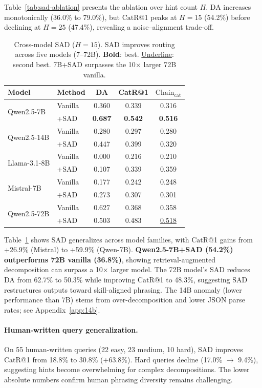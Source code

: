 \documentclass[11pt]{article}
\newcommand{\catrecall}{\text{CatR}}
\newcommand{\chaincat}{\text{Chain}_\text{cat}}
\begin{document}
Table~\ref{tab:sad-ablation} presents the ablation over hint count $H$.
DA increases monotonically (36.0\% to 79.0\%), but $\catrecall$@1 peaks at $H{=}15$ (54.2\%) before declining at $H{=}25$ (47.4\%), revealing a noise--alignment trade-off.

\begin{table}[t]
\centering
\small
\begin{tabular}{llccc}
\toprule
\textbf{Model} & \textbf{Method} & \textbf{DA} & \textbf{CatR@1} & $\chaincat$ \\
\midrule
\multirow{2}{*}{Qwen2.5-7B} & Vanilla & 0.360 & 0.339 & 0.316 \\
 & +SAD & \textbf{0.687} & \textbf{0.542} & \textbf{0.516} \\
\midrule
\multirow{2}{*}{Qwen2.5-14B} & Vanilla & 0.280 & 0.297 & 0.280 \\
 & +SAD & 0.447 & 0.399 & 0.320 \\
\midrule
\multirow{2}{*}{Llama-3.1-8B} & Vanilla & 0.000 & 0.216 & 0.210 \\
 & +SAD & 0.107 & 0.339 & 0.359 \\
\midrule
\multirow{2}{*}{Mistral-7B} & Vanilla & 0.177 & 0.242 & 0.248 \\
 & +SAD & 0.273 & 0.307 & 0.301 \\
\midrule
\multirow{2}{*}{Qwen2.5-72B} & Vanilla & 0.627 & 0.368 & 0.358 \\
 & +SAD & 0.503 & 0.483 & \underline{0.518} \\
\bottomrule
\end{tabular}
\caption{Cross-model SAD ($H{=}15$). SAD improves routing across five models (7--72B). \textbf{Bold}: best. \underline{Underline}: second best. 7B+SAD surpasses the 10$\times$ larger 72B vanilla.}
\label{tab:sad-crossmodel}
\end{table}

Table~\ref{tab:sad-crossmodel} shows SAD generalizes across model families, with $\catrecall$@1 gains from +26.9\% (Mistral) to +59.9\% (Qwen-7B).
\textbf{Qwen2.5-7B+SAD (54.2\%) outperforms 72B vanilla (36.8\%)}, showing retrieval-augmented decomposition can surpass a 10$\times$ larger model.
The 72B model's SAD reduces DA from 62.7\% to 50.3\% while improving $\catrecall$@1 to 48.3\%, suggesting SAD restructures outputs toward skill-aligned phrasing.
The 14B anomaly (lower performance than 7B) stems from over-decomposition and lower JSON parse rates; see Appendix~\ref{app:14b}.

\paragraph{Human-written query generalization.}
On 55 human-written queries (22 easy, 23 medium, 10 hard), SAD improves $\catrecall$@1 from 18.8\% to 30.8\% (+63.8\%).
Hard queries decline (17.0\% $\to$ 9.4\%), suggesting hints become overwhelming for complex decompositions.
The lower absolute numbers confirm human phrasing diversity remains challenging.
\end{document}

